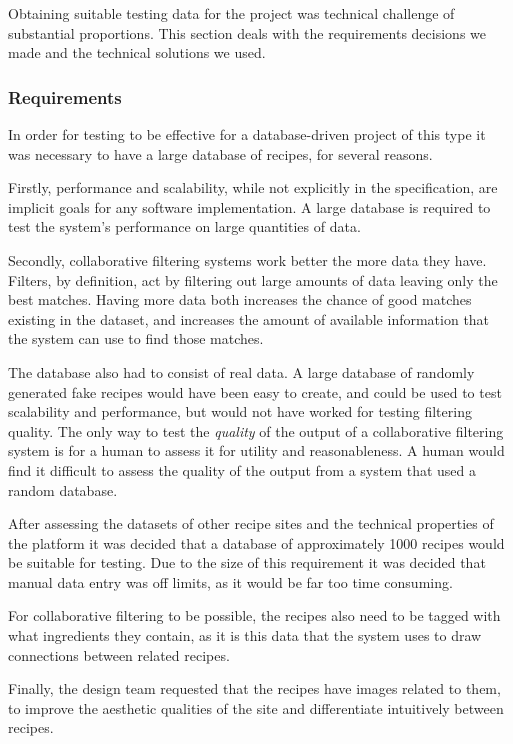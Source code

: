 Obtaining suitable testing data for the project was technical challenge of substantial proportions. This section deals with the requirements decisions we made and the technical solutions we used.

\subsubsection{Requirements}
In order for testing to be effective for a database-driven project of this type it was necessary to have a large database of recipes, for several reasons.

Firstly, performance and scalability, while not explicitly in the specification, are implicit goals for any software implementation. A large database is required to test the system's performance on large quantities of data.

Secondly, collaborative filtering systems work better the more data they have. Filters, by definition, act by filtering out large amounts of data leaving only the best matches. Having more data both increases the chance of good matches existing in the dataset, and increases the amount of available information that the system can use to find those matches.

The database also had to consist of real data. A large database of randomly generated fake recipes would have been easy to create, and could be used to test scalability and performance, but would not have worked for testing filtering quality. The only way to test the \textit{quality} of the output of a collaborative filtering system is for a human to assess it for utility and reasonableness. A human would find it difficult to assess the quality of the output from a system that used a random database.

After assessing the datasets of other recipe sites and the technical properties of the platform it was decided that a database of approximately 1000 recipes would be suitable for testing. Due to the size of this requirement it was decided that manual data entry was off limits, as it would be far too time consuming.

For collaborative filtering to be possible, the recipes also need to be tagged with what ingredients they contain, as it is this data that the system uses to draw connections between related recipes.

Finally, the design team requested that the recipes have images related to them, to improve the aesthetic qualities of the site and differentiate intuitively between recipes.

